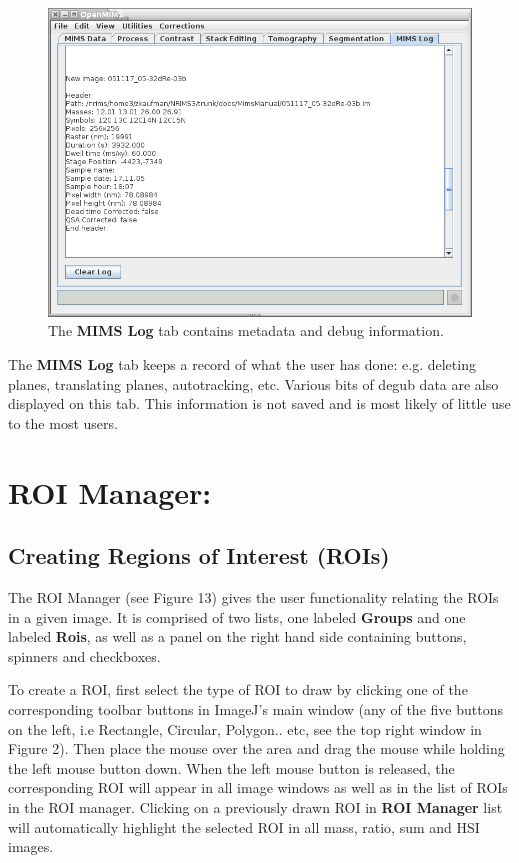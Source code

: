 \documentclass{article}
\begin{document}
	\begin{figure}[h]
	\centering
	\includegraphics[scale=0.70]{snapshot_MimsLog.png}
	\caption{The \textbf{MIMS Log} tab contains metadata and debug information.}
	\end{figure}
	
	The \textbf{MIMS Log} tab keeps a record of what the user has done: 
	e.g. deleting planes, translating planes, autotracking, etc. Various bits
	of degub data are also displayed on this tab.
	This information is not saved and is most likely of little use to the most users.


\newpage
\section*{ROI Manager:}
\subsection*{Creating Regions of Interest (ROIs)}

	The ROI Manager (see Figure 13) gives the user functionality relating the ROIs
	in a given image. It is comprised of two lists, one labeled \textbf{Groups} and
	one labeled \textbf{Rois}, as well as a panel on the right hand side containing 
	buttons, spinners and checkboxes. 

   To create a ROI, first select the type of ROI to draw by clicking
   one of the corresponding toolbar buttons in ImageJ's main window (any of the five buttons on the left,
   i.e Rectangle, Circular, Polygon.. etc, see the top right window in Figure 2).
   Then place the mouse over the area and drag the mouse while holding the left mouse button down. When the left
   mouse button is released, the corresponding ROI will appear in all image windows
   as well as in the list of ROIs in the ROI manager.
   Clicking on a previously drawn ROI in \textbf{ROI Manager} list will automatically highlight the selected
   ROI in all mass, ratio, sum and HSI images.
   
\end{document}
